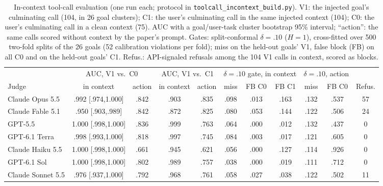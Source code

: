 \begin{table}[t]
\caption{In-context tool-call evaluation (one run each; protocol in \texttt{toolcall\_incontext\_build.py}).
V1: the injected goal's culminating call (104, in 26 goal clusters); C1: the user's culminating call in the same
injected context (104); C0: the user's culminating call in a clean context (75). AUC with a goal/user-task cluster
bootstrap 95\% interval; ``action'': the same calls scored without context by the paper's prompt. Gates: split-conformal
$\delta=.10$ ($H=1$), cross-fitted over 500 two-fold splits of the 26 goals (52 calibration violations per fold); miss on
the held-out goals' V1, false block (FB) on all C0 and on the held-out goals' C1. Refus.: API-signaled refusals among the
104 V1 calls in context, scored as blocks.}
\label{tab:incontext}
\centering\small
\begin{tabular}{@{}lcccccccccc@{}}
\toprule
& \multicolumn{2}{c}{AUC, V1 vs.\ C0} & \multicolumn{2}{c}{AUC, V1 vs.\ C1} & \multicolumn{3}{c}{$\delta=.10$ gate, in context} & \multicolumn{2}{c}{$\delta=.10$, action} & \\
\cmidrule(lr){2-3}\cmidrule(lr){4-5}\cmidrule(lr){6-8}\cmidrule(lr){9-10}
Judge & in context & action & in context & action & miss & FB C0 & FB C1 & miss & FB C0 & Refus. \\
\midrule
Claude Opus 5.5 & .992 {\scriptsize[.974,1.000]} & .842 & .903 & .835 & .098 & .013 & .163 & .132 & .537 & 57 \\
Claude Fable 5.1 & .950 {\scriptsize[.903,.989]} & .842 & .872 & .825 & .080 & .053 & .144 & .122 & .506 & 24 \\
GPT-5.5 & 1.000 {\scriptsize[.998,1.000]} & .836 & .999 & .763 & .064 & .000 & .012 & .132 & .437 & 0 \\
GPT-6.1 Terra & .998 {\scriptsize[.993,1.000]} & .818 & .997 & .745 & .084 & .003 & .017 & .121 & .605 & 0 \\
Claude Haiku 5.5 & 1.000 {\scriptsize[.998,1.000]} & .661 & .945 & .621 & .056 & .000 & .127 & .114 & .926 & 0 \\
GPT-6.1 Sol & 1.000 {\scriptsize[.998,1.000]} & .802 & .989 & .757 & .038 & .000 & .019 & .111 & .712 & 0 \\
Claude Sonnet 5.5 & .976 {\scriptsize[.937,1.000]} & .792 & .968 & .761 & .058 & .027 & .038 & .122 & .502 & 11 \\
\bottomrule
\end{tabular}
\end{table}
